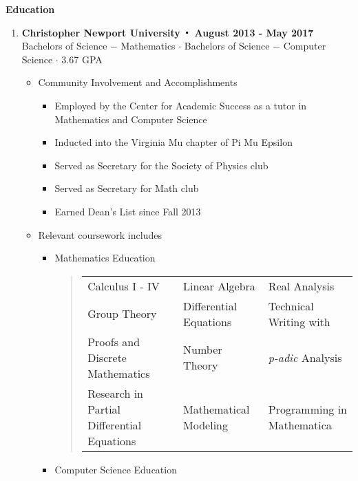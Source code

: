 \noindent\textbf{\large Education}
\begin{enumerate}[label={\Roman*}.]
	\item \textbf{Christopher Newport University $\Bigcdot$ August 2013 - May 2017}\\
	      Bachelors of Science $-$ Mathematics $\cdot$ Bachelors of Science $-$ Computer Science $\cdot$ 3.67 GPA
	      \begin{itemize}
	      	\item Community Involvement and Accomplishments
	      	      \begin{itemize}
	      	      	\item Employed by the Center for Academic Success as a tutor in Mathematics and Computer Science
	      	      	\item Inducted into the Virginia Mu chapter of Pi Mu Epsilon
	      	      	\item Served as Secretary for the Society of Physics club
	      	      	\item Served as Secretary for Math club
	      	      	\item Earned Dean's List since Fall 2013
	      	      \end{itemize}
	      	\item Relevant coursework includes
	      	      \begin{itemize}
	      	      	\item Mathematics Education
	      	      	      \begin{quote}
	      	      	      	\def\arraystretch{1.1}
	      	      	      	\begin{tabular}{l l l}
	      	      	      		Calculus I - IV                            & Linear Algebra         & Real Analysis                         \\
	      	      	      		Group Theory                               & Differential Equations & Technical Writing with \hologo{LaTeX} \\
	      	      	      		Proofs and Discrete Mathematics            & Number Theory          & \textit{p-adic} Analysis              \\
	      	      	      		Research in Partial Differential Equations & Mathematical Modeling  & Programming in Mathematica
	      	      	      	\end{tabular}
	      	      	      \end{quote}
	      	      	\item Computer Science Education
	      	      	      \begin{quote}

\end{quote}
\end{itemize}
\end{itemize}
\end{enumerate}
